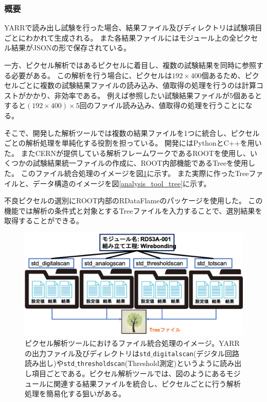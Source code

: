 \subsubsection{概要}
YARRで読み出し試験を行った場合、結果ファイル及びディレクトリは試験項目ごとにわかれて生成される。
また各結果ファイルにはモジュール上の全ピクセル結果がJSONの形で保存されている。

一方、ピクセル解析ではあるピクセルに着目し、複数の試験結果を同時に参照する必要がある。
この解析を行う場合に、ピクセルは$192\times 400$個あるため、ピクセルごとに複数の試験結果ファイルの読み込み、値取得の処理を行うのは計算コストがかかり、非効率である。
例えば参照したい試験結果ファイルが5個あるとすると$(192\times 400)\times 5$回のファイル読み込み、値取得の処理を行うことになる。

そこで、開発した解析ツールでは複数の結果ファイルを1つに統合し、ピクセルごとの解析処理を単純化する役割を担っている。
開発にはPythonとC++を用いた。
またCERNが提供している解析フレームワークであるROOT\cite{4-5}を使用し、いくつかの試験結果統一ファイルの作成に、ROOT内部機能であるTreeを使用した。
このファイル統合処理のイメージを図\ref{analysis_tool_motivation}に示す。
また実際に作ったTreeファイルと、データ構造のイメージを図\ref{analysis_tool_tree}に示す。

不良ピクセルの選別にROOT内部のRDataFlameのパッケージを使用した。
この機能では解析の条件式と対象とするTreeファイルを入力することで、選別結果を取得することができる。

\begin{figure}[bpt]\centering
\includegraphics[width=12cm]{./analysis_tool_motivation.png}
\caption[ピクセル解析ツールにおけるファイル統合処理のイメージ]{ピクセル解析ツールにおけるファイル統合処理のイメージ。YARRの出力ファイル及びディレクトリは\texttt{std$\_$digitalscan}(デジタル回路読み出し)や\texttt{std$\_$thresholdscan}(Threshold測定)というように読み出し項目ごとである。ピクセル解析ツールでは、図のようにあるモジュールに関連する結果ファイルを統合し、ピクセルごとに行う解析処理を簡易化する狙いがある。}
\label{analysis_tool_motivation}
\end{figure}


